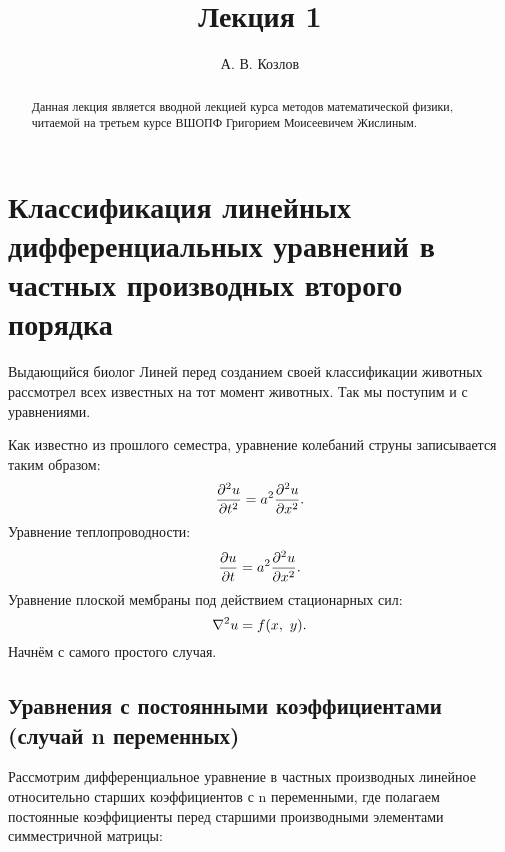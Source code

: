 \documentclass[a4paper,9pt,russian]{article}
\title{Лекция 1}
\author{А. В. Козлов}
\begin{document}
\maketitle
\begin{abstract}
Данная лекция является вводной лекцией курса методов математической физики, читаемой на третьем курсе ВШОПФ Григорием Моисеевичем Жислиным.
\end{abstract}
\section{Классификация линейных дифференциальных уравнений в частных производных второго порядка}
Выдающийся биолог Линей перед созданием своей классификации животных рассмотрел всех известных на тот момент животных.
Так мы поступим и с уравнениями.\par
Как известно из прошлого семестра, уравнение колебаний струны записывается таким образом:
\[
	\pdv[2]{u}{t} = a^2\pdv[2]{u}{x}
.\]
Уравнение теплопроводности:
\[
	\pdv{u}{t}=a^2\pdv[2]{u}{x}
.\] 
Уравнение плоской мембраны под действием стационарных сил:
\[
	\laplacian{u} = f\qty(x,\ y)
.\]
Начнём с самого простого случая.
\subsection{Уравнения с постоянными коэффициентами (случай n переменных)}
Рассмотрим дифференциальное уравнение в частных производных линейное относительно старших коэффициентов с n переменными, где полагаем постоянные коэффициенты перед старшими производными элементами симместричной матрицы:
\begin{equation}
	
\end{equation} 
\end{document}
